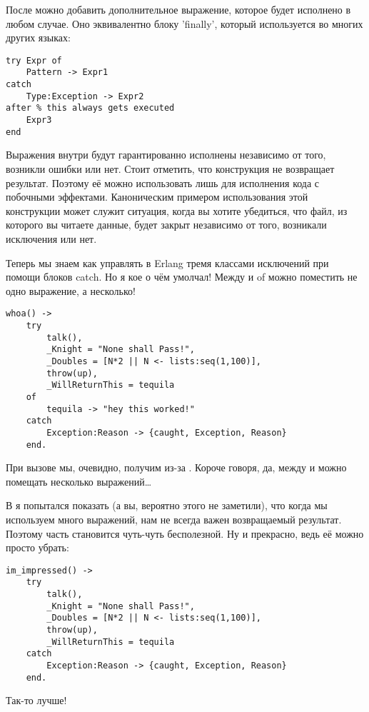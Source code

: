 После  можно добавить дополнительное выражение, которое будет исполнено в любом случае.
Оно эквивалентно блоку 'finally', который используется во многих других языках:
\begin{lstlisting}[style=erlang]
try Expr of
    Pattern -> Expr1
catch
    Type:Exception -> Expr2
after % this always gets executed
    Expr3
end
\end{lstlisting}

Выражения внутри  будут гарантированно исполнены независимо от того, возникли ошибки или нет.
Стоит отметить, что конструкция  не возвращает результат.
Поэтому её можно использовать лишь для исполнения кода с побочными эффектами.
Каноническим примером использования этой конструкции может служит ситуация, когда вы хотите убедиться, что файл, из которого вы читаете данные, будет закрыт независимо от того, возникали исключения или нет.

Теперь мы знаем как управлять в Erlang тремя классами исключений при помощи блоков catch.
Но я кое о чём умолчал!
Между  и {of} можно поместить не одно выражение, а несколько!
\begin{lstlisting}[style=erlang]
whoa() ->
    try
        talk(),
        _Knight = "None shall Pass!",
        _Doubles = [N*2 || N <- lists:seq(1,100)],
        throw(up),
        _WillReturnThis = tequila
    of
        tequila -> "hey this worked!"
    catch
        Exception:Reason -> {caught, Exception, Reason}
    end.
\end{lstlisting}

При вызове  мы, очевидно, получим  из\--за .
Короче говоря, да, между  и  можно помещать несколько выражений\ldots

В  я попытался показать (а вы, вероятно этого не заметили), что когда мы используем много выражений, нам не всегда важен возвращаемый результат.
Поэтому часть  становится чуть\--чуть бесполезной.
Ну и прекрасно, ведь её можно просто убрать:
\begin{lstlisting}[style=erlang]
im_impressed() ->
    try
        talk(),
        _Knight = "None shall Pass!",
        _Doubles = [N*2 || N <- lists:seq(1,100)],
        throw(up),
        _WillReturnThis = tequila
    catch
        Exception:Reason -> {caught, Exception, Reason}
    end.
\end{lstlisting}

Так\--то лучше!

